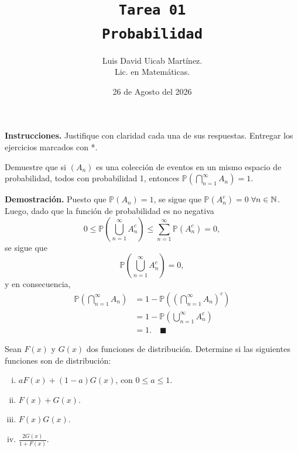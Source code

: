 \documentclass[11pt]{scrartcl}
\title{\texttt{Tarea 01
\\ Probabilidad}}
\author{Luis David Uicab Martínez. 
\\Lic. en Matemáticas.}
\date{26 de Agosto del 2026}
\begin{document}
\maketitle
\textbf{Instrucciones.} Justifique con claridad cada una de sus respuestas. Entregar los ejercicios marcados con *.

\begin{mdframed}[style=mdpurplebox, frametitle={Ejercicio 02 *, Tarea 01, Probabilidad}]
    Demuestre que si $(A_n)$ es una colección de eventos en un mismo espacio de probabilidad, todos con probabilidad 1,
    entonces $\mathbb{P}\left(\bigcap_{n=1}^\infty A_n\right)=1$.
\end{mdframed}
\textbf{Demostración.} Puesto que $\mathbb{P}(A_n)=1$, se sigue que $\mathbb{P}(A_n^c)=0$ $\forall n \in \mathbb N$. Luego, dado que
la función de probabilidad es no negativa
\[
 0\leq \mathbb{P}\left(\bigcup_{n=1}^\infty A_n^c\right) \leq \sum_{n=1}^{\infty}\mathbb{P}(A_n^c)=0,
\]
se sigue que
\[
\mathbb{P}\left(\bigcup_{n=1}^\infty A_n^c\right)=0,
\]
y en consecuencia,
\begin{align*}
    \mathbb{P}\left(\bigcap_{n=1}^\infty A_n\right) &= 1 - \mathbb{P}\left(\left(\bigcap_{n=1}^\infty A_n\right)^c\right) \\
    &= 1-\mathbb{P}\left(\bigcup_{n=1}^\infty A_n^c\right) \\
    &= 1. \quad \blacksquare
\end{align*}

\begin{mdframed}[style=mdpurplebox, frametitle={Ejercicio 04 *, Tarea 01, Probabilidad}]
    Sean $F(x)$ y $G(x)$ dos funciones de distribución. Determine si las siguientes funciones son de distribución:
    \begin{enumerate}[(i)]
        \item $aF(x)+(1-a)G(x)$, con $0\leq a \leq 1$.
        \item $F(x)+G(x)$.
        \item $F(x)G(x)$.
        \item $\frac{2G(x)}{1+F(x)}$. 
    \end{enumerate}
\end{mdframed}
\end{document}
